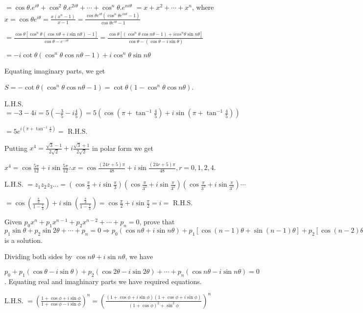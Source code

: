   $= \cos\theta.e^{i\theta} + \cos^2\theta.e^{2i\theta} + \cdots + \cos^n\theta.e^{ni\theta}$
  $= x + x^2 + \cdots + x^n$, where $x = \cos\theta e^{i\theta}= \frac{x(x^n - 1)}{x - 1} = \frac{\cos\theta
    e^{i\theta}(\cos^n\theta e^{in\theta} - 1)}{\cos\theta e^{i\theta} - 1}$

  $= \frac{\cos\theta[\cos^n\theta(\cos n\theta + i \sin n\theta) - 1]}{\cos\theta - e^{-i\theta}} =
  \frac{\cos\theta[(\cos^n\theta\cos n\theta -1) + i cos^n\theta\sin n\theta]}{\cos\theta - (\cos\theta
    - i\sin\theta)}$

  $= -i \cot\theta(\cos^n\theta \cos n\theta - 1) + i \cos^n\theta \sin n\theta$

  Equating imaginary parts, we get

  $S = -\cot\theta(\cos^n\theta \cos n\theta - 1) = \cot\theta(1 - \cos^n\theta\cos n\theta)$.
\item L.H.S. $= -3 -4i = 5\left(-\frac{3}{5} - i\frac{4}{5}\right) = 5\left(\cos\left(\pi +
  \tan^{-1}\frac{4}{5}\right) +i \sin\left(\pi + \tan^{-1}\frac{4}{5}\right)\right)$

  $= 5e^{i\left(\pi + \tan^{-1}\frac{4}{5}\right)} =$ R.H.S.
\item Putting $x^4 = \frac{\sqrt{3} - 1}{2\sqrt{2}} + i\frac{\sqrt{3} + 1}{2\sqrt{2}}$ in polar form we get

  $x^4 = \cos\frac{5\pi}{12} + i \sin\frac{5\pi}{12} \therefore x = \cos\frac{(24r + 5)\pi}{48} + i
  \sin\frac{(24r + 5)\pi}{48}, r = 0, 1, 2, 4$.
\item L.H.S. $= z_1z_2z_3\ldots = \left(\cos\frac{\pi}{3} +
  i\sin\frac{\pi}{3}\right)\left(\cos\frac{\pi}{3^2} + i\sin\frac{\pi}{3^2}\right)\left(\cos\frac{\pi}{3^3}
  + i\sin\frac{\pi}{3^3}\right)\cdots$

  $= \cos\left(\frac{\frac{\pi}{3}}{1 - \frac{1}{3}}\right) + i\sin\left(\frac{\frac{\pi}{3}}{1 -
    \frac{1}{3}}\right) = \cos\frac{\pi}{2} + i\sin\frac{\pi}{2} = i =$ R.H.S.
\item Given $p_0x^n + p_1x^{n - 1} + p_2x^{n - 2} + \cdots + p_n = 0$, prove that $p_1\sin\theta +
  p_2\sin2\theta + \cdots + p_n = 0 \Rightarrow p_0(\cos n\theta + i\sin n\theta) + p_1[\cos(n - 1)\theta +
    \sin(n - 1)\theta] + p_2[\cos(n - 2)\theta + i\sin(n - 2)\theta] + \cdots + p_n = 0\;[\because
    \cos\theta + i\sin\theta]$ is a solution.

  Dividing both sides by $\cos n\theta + i\sin n\theta$, we have

  $p_0 + p_1(\cos\theta - i\sin\theta) + p_2(\cos2\theta - i\sin2\theta) + \cdots + p_n(\cos n\theta - i\sin
  n\theta) = 0$. Equating real and imaghinary parts we have required equations.
\item L.H.S. $= \left(\frac{1 + \cos \phi + i \sin\phi}{1 + \cos \phi - i\sin\phi}\right)^n = \left(\frac{(1
  + \cos\phi + i \sin\phi)(1 + \cos\phi + i\sin\phi)}{(1 + \cos\phi)^2 + \sin^2\phi}\right)^n$

